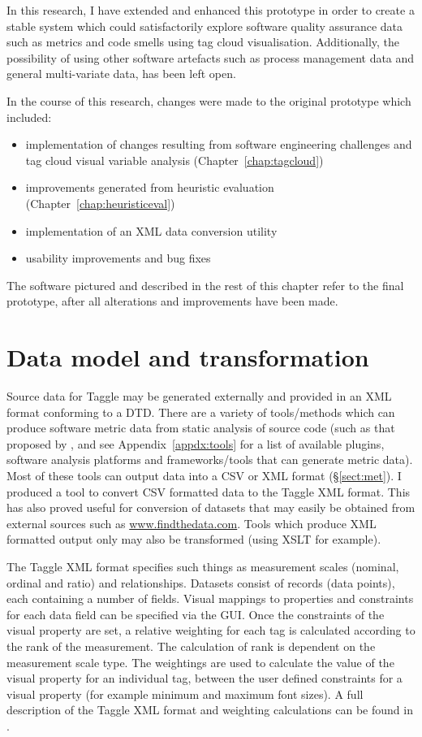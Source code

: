 In this research, I have extended and enhanced this prototype in order to create a stable system which could satisfactorily explore software quality assurance data such as metrics and code smells using tag cloud visualisation. Additionally, the possibility of using other software artefacts such as process management data and general multi-variate data, has been left open.

In the course of this research, changes were made to the original prototype which included:

\begin{itemize}
\item implementation of changes resulting from software engineering challenges and tag cloud visual variable analysis (Chapter~\ref{chap:tagcloud})
\item improvements generated from heuristic evaluation (Chapter~\ref{chap:heuristiceval})
\item implementation of an XML data conversion utility 
\item usability improvements and bug fixes
\end{itemize}

The software pictured and described in the rest of this chapter refer to the final prototype, after all alterations and improvements have been made.

\section{Data model and transformation}\label{sect:datamodel}

Source data for Taggle may be generated externally and provided in an XML format conforming to a DTD. There are a variety of tools/methods which can produce software metric data from static analysis of source code (such as that proposed by \citet{irwin03}, and see Appendix~\ref{appdx:tools} for a list of available plugins, software analysis platforms and frameworks/tools that can generate metric data). Most of these tools can output data into a CSV or XML format (\S\ref{sect:met}). I produced a tool to convert CSV formatted data to the Taggle XML format. This has also proved useful for conversion of datasets that may easily be obtained from external sources such as \url{www.findthedata.com}. Tools which produce XML formatted output only may also be transformed (using XSLT for example). 

The Taggle XML format specifies such things as measurement scales (nominal, ordinal and ratio) and relationships. Datasets consist of records (data points), each containing a number of fields. Visual mappings to properties and constraints for each data field can be specified via the GUI. Once the constraints of the visual property are set, a relative weighting for each tag is calculated according to the rank of the measurement. The calculation of rank is dependent on the measurement scale type. The weightings are used to calculate the value of the visual property for an individual tag, between the user defined constraints for a visual property (for example minimum and maximum font sizes). A full description of the Taggle XML format and weighting calculations can be found in \citet{deaker11c}.

